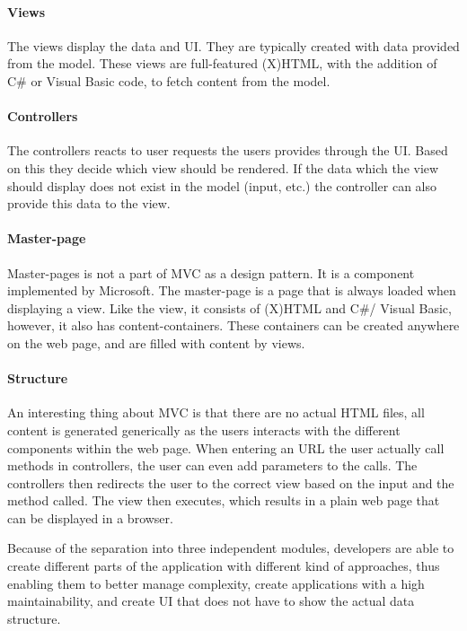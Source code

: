 \paragraph{Views}
The views display the data and UI. They are typically created with data provided from the model. These views are full-featured (X)HTML, with the addition of C\# or Visual Basic code, to fetch content from the model.

\paragraph{Controllers}
The controllers reacts to user requests the users provides through the UI. Based on this they decide which view should be rendered. If the data which the view should display does not exist in the model (input, etc.) the controller can also provide this data to the view.

\paragraph{Master-page}
Master-pages is not a part of MVC as a design pattern. It is a component implemented by Microsoft. The master-page is a page that is always loaded when displaying a view. Like the view, it consists of (X)HTML and C\#/ Visual Basic, however, it also has content-containers. These containers can be created anywhere on the web page, and are filled with content by views.

\paragraph{Structure}
An interesting thing about MVC is that there are no actual HTML files, all content is generated generically as the users interacts with the different components within the web page. When entering an URL the user actually call methods in controllers, the user can even add parameters to the calls. The controllers then redirects the user to the correct view based on the input and the method called. The view then executes, which results in a plain web page that can be displayed in a browser.

Because of the separation into three independent modules, developers are able to create different parts of the application with different kind of approaches, thus enabling them to better manage complexity, create applications with a high maintainability, and create UI that does not have to show the actual data structure.

